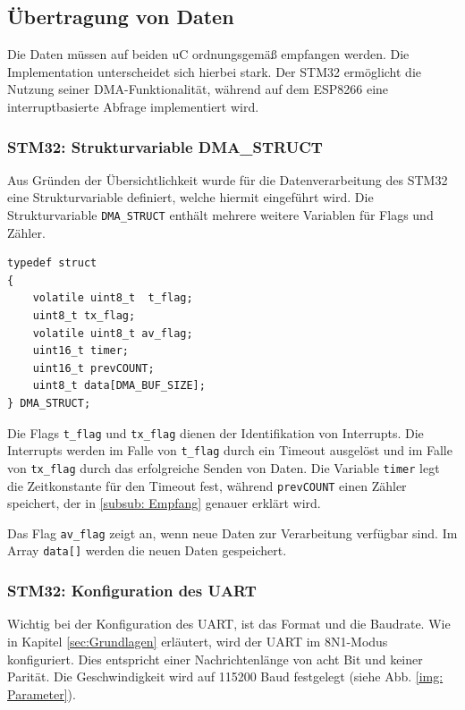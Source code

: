 \subsection{Übertragung von Daten}

Die Daten müssen auf beiden \ac{uC} ordnungsgemäß empfangen werden. Die Implementation unterscheidet sich hierbei stark. Der STM32 ermöglicht
die Nutzung seiner \ac{DMA}-Funktionalität, während auf dem ESP8266 eine interruptbasierte Abfrage implementiert wird.

\subsubsection{STM32: Strukturvariable DMA\_STRUCT}
\label{subsub: DMASTRUCT}

Aus Gründen der Übersichtlichkeit wurde für die Datenverarbeitung des STM32 eine Strukturvariable definiert, welche hiermit eingeführt wird.
Die Strukturvariable \lstinline!DMA_STRUCT! enthält mehrere weitere Variablen für Flags und Zähler.

\begin{lstlisting}[caption={\textit{DMA Strukturvariable}}]
typedef struct
{
    volatile uint8_t  t_flag;   
    uint8_t tx_flag;	
    volatile uint8_t av_flag;		
    uint16_t timer;             
    uint16_t prevCOUNT;      
    uint8_t data[DMA_BUF_SIZE];   
} DMA_STRUCT;
\end{lstlisting}

Die Flags \lstinline!t_flag! und \lstinline!tx_flag! dienen der Identifikation von Interrupts. Die Interrupts werden im Falle von \lstinline!t_flag! durch ein
Timeout ausgelöst und im Falle von \lstinline!tx_flag! durch das erfolgreiche Senden von Daten. Die Variable \lstinline!timer! legt 
die Zeitkonstante für den Timeout fest, während \lstinline!prevCOUNT! einen Zähler speichert, der in \ref{subsub: Empfang} genauer erklärt wird.  

Das Flag \lstinline!av_flag! zeigt an, wenn neue Daten zur Verarbeitung verfügbar sind. Im Array \lstinline!data[]! werden die neuen Daten gespeichert.

\subsubsection{STM32: Konfiguration des UART}
Wichtig bei der Konfiguration des \acs{UART}, ist das Format und die Baudrate. Wie in Kapitel \ref{sec:Grundlagen} erläutert, wird der \ac{UART} im 8N1-Modus
konfiguriert. Dies entspricht einer Nachrichtenlänge von acht Bit und keiner Parität. Die Geschwindigkeit wird auf 115200 Baud festgelegt (siehe Abb. \ref{img: Parameter}). 

